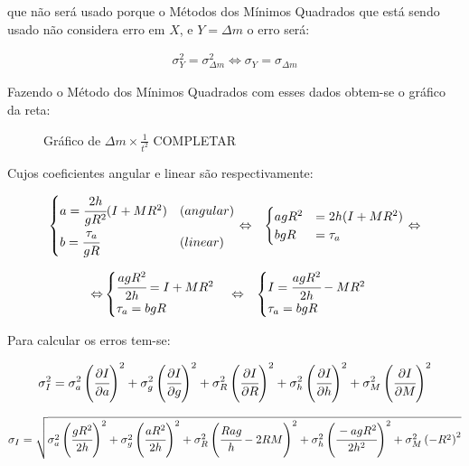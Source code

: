 \documentclass[a4paper]{article}
\begin{document}
que não será usado porque o Métodos dos Mínimos Quadrados que está sendo usado não considera erro em $X$, e $Y=\Delta m$ o erro será:

\begin{align}
\sigma_{Y}^{2}=\sigma_{\Delta m}^{2}\Leftrightarrow\sigma_{Y}=\sigma_{\Delta m}
\end{align}

Fazendo o Método dos Mínimos Quadrados com esses dados obtem-se o gráfico da reta:

\begin{wrapfigure}{o}{0.5\columnwidth}%
	\caption{Gráfico de $\Delta m\times\frac{1}{t^{2}}$ COMPLETAR}
	
\end{wrapfigure}%

Cujos coeficientes angular e linear são respectivamente:

\begin{eqnarray*}
\begin{cases}
a=\cfrac{2h}{gR^{2}}(I+MR^{2}) & (angular)\\
b=\cfrac{\tau_{a}}{gR} & (linear)
\end{cases} & \Leftrightarrow & \begin{cases}
agR^{2} & =2h(I+MR^{2})\\
bgR & =\tau_{a}
\end{cases}\Leftrightarrow
\end{eqnarray*}


\begin{eqnarray*}
\Leftrightarrow & \begin{cases}
\cfrac[r]{agR^{2}}{2h}=I+MR^{2}\\
\tau_{a}=bgR
\end{cases}\Leftrightarrow & \begin{cases}
I=\cfrac[r]{agR^{2}}{2h}-MR^{2}\\
\tau_{a}=bgR
\end{cases}
\end{eqnarray*}


Para calcular os erros tem-se:

$$ \sigma_{I}^{2}=\sigma_{a}^{2}\left(\cfrac[r]{\partial I}{\partial a}\right)^{2}+\sigma_{g}^{2}\left(\cfrac[r]{\partial I}{\partial g}\right)^{2}+\sigma_{R}^{2}\left(\cfrac{\partial I}{\partial R}\right)^{2}+\sigma_{h}^{2}\left(\cfrac[r]{\partial I}{\partial h}\right)^{2}+\sigma_{M}^{2}\left(\cfrac{\partial I}{\partial M}\right)^{2} $$

\begin{align}
\sigma_{I}=\sqrt{\sigma_{a}^{2}\left(\cfrac[r]{gR^{2}}{2h}\right)^{2}+\sigma_{g}^{2}\left(\cfrac[r]{aR^{2}}{2h}\right)^{2}+\sigma_{R}^{2}\left(\cfrac{Rag}{h}-2RM\right)^{2}+\sigma_{h}^{2}\left(\cfrac[r]{-agR^{2}}{2h^{2}}\right)^{2}+\sigma_{M}^{2}\left(-R^{2}\right)^{2}}\end{align}
\end{document}
